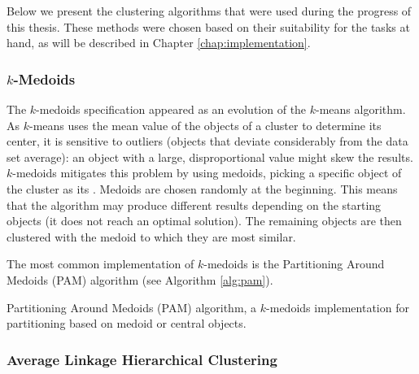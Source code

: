 Below we present the clustering algorithms that were used during the progress of
this thesis. These methods were chosen based on their suitability for the tasks
at hand, as will be described in Chapter \ref{chap:implementation}.

\subsubsection*{$k$-Medoids}

The $k$-medoids specification appeared as an evolution of the $k$-means
algorithm. As $k$-means uses the mean value of the objects of a cluster to
determine its center, it is sensitive to outliers (objects that deviate
considerably from the data set average): an object with a large, disproportional
value might skew the results. $k$-medoids mitigates this problem by using
medoids, picking a specific object of the cluster as its 
\cite{han2006data}. Medoids are chosen randomly at the beginning. This means
that the algorithm may produce different results depending on the starting
objects (it does not reach an optimal solution). The remaining objects are then
clustered with the medoid to which they are most similar.

The most common implementation of $k$-medoids is the Partitioning Around
Medoids (PAM) algorithm (see Algorithm \ref{alg:pam}).

\begin{algorithm}
  \LinesNumbered
  \BlankLine

  \BlankLine

  \caption[Partitioning Around Medoids (PAM) algorithm]{
    Partitioning Around Medoids (PAM) algorithm, a $k$-medoids implementation
    for partitioning based on medoid or central objects.
  }
  \label{alg:pam}
\end{algorithm}

\subsubsection*{Average Linkage Hierarchical Clustering}

